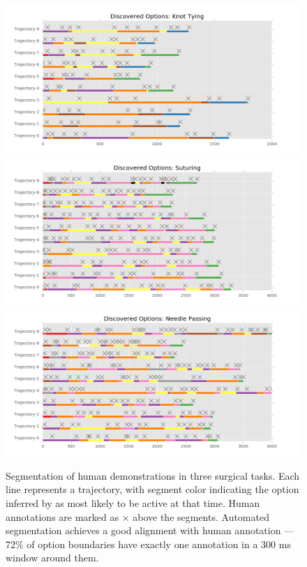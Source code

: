 \begin{figure}[ht!]
    \centering
    \includegraphics[width=0.7\columnwidth]{ddco-experiments/options-knot-tying.png}
    \includegraphics[width=0.7\columnwidth]{ddco-experiments/options-suturing.png}
    \includegraphics[width=0.7\columnwidth]{ddco-experiments/options-needle-passing.png}
    \caption{Segmentation of human demonstrations in three surgical tasks. Each line represents a trajectory, with segment color indicating the option inferred by \alg as most likely to be active at that time. Human annotations are marked as $\times$ above the segments. Automated segmentation achieves a good alignment with human annotation --- 72\% of option boundaries have exactly one annotation in a 300 ms window around them. \label{surgery-1}}
\end{figure}
